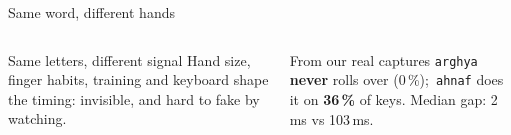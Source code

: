 \documentclass[aspectratio=169,11pt,t]{beamer}
\begin{document}
\begin{frame}{Same word, different hands}
\vspace{1.5mm}
\begin{columns}[T]
\begin{card}[terra]{Same letters, different signal}
Hand size, finger habits, training and keyboard shape the timing: invisible, and hard to fake by watching.
\end{card}
\begin{card}[sky]{From our real captures}
\texttt{arghya} \textbf{never} rolls over (0\,\%);\ \texttt{ahnaf} does it on \textbf{36\,\%} of keys.
Median gap: 2\,ms vs 103\,ms.
\end{card}
\end{columns}
\end{frame}

\end{document}

